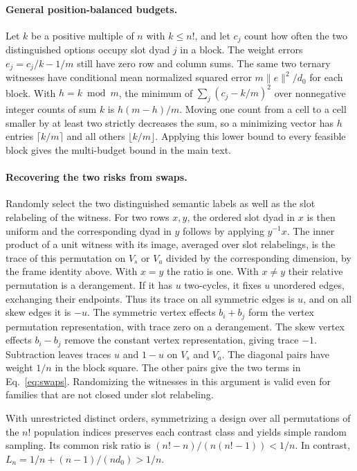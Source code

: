 \paragraph{General position-balanced budgets.}
Let $k$ be a positive multiple of $n$ with $k\le n!$, and let
$c_j$ count how often the two distinguished options occupy slot dyad
$j$ in a block. The weight errors $e_j=c_j/k-1/m$ still have zero
row and column sums. The same two ternary witnesses have conditional
mean normalized squared error $m\|e\|^2/d_0$ for each block. With
$h=k\bmod m$, the minimum of $\sum_j(c_j-k/m)^2$ over nonnegative
integer counts of sum $k$ is $h(m-h)/m$. Moving one count from a
cell to a cell smaller by at least two strictly decreases the sum,
so a minimizing vector has $h$ entries $\lceil k/m\rceil$ and all
others $\lfloor k/m\rfloor$. Applying this lower bound to every
feasible block gives the multi-budget bound in the main text.

\paragraph{Recovering the two risks from swaps.}
Randomly select the two distinguished semantic labels as well as the
slot relabeling of the witness. For two rows $x,y$, the ordered slot
dyad in $x$ is then uniform and the corresponding dyad in $y$ follows
by applying $y^{-1}x$. The inner product of a unit witness with its
image, averaged over slot relabelings, is the trace of this permutation
on $V_s$ or $V_a$ divided by the corresponding dimension, by the frame
identity above. With $x=y$ the ratio is one. With $x\ne y$ their
relative permutation is a derangement. If it has $u$ two-cycles, it
fixes $u$ unordered edges, exchanging their endpoints. Thus its trace
on all symmetric edges is $u$, and on all skew edges it is $-u$.
The symmetric vertex effects $b_i+b_j$ form the vertex permutation
representation, with trace zero on a derangement. The skew vertex
effects $b_i-b_j$ remove the constant vertex representation, giving
trace $-1$. Subtraction leaves traces $u$ and $1-u$ on $V_s$ and
$V_a$. The diagonal pairs have weight $1/n$ in the block square.
The other pairs give the two terms in Eq.~\eqref{eq:swaps}. Randomizing
the witnesses in this argument is valid even for families that are
not closed under slot relabeling.

With unrestricted distinct orders, symmetrizing a design over all
permutations of the $n!$ population indices preserves each contrast
class and yields simple random sampling. Its common risk ratio is
$(n!-n)/(n(n!-1))<1/n$. In contrast, $L_n=1/n+(n-1)/(nd_0)>1/n$.

